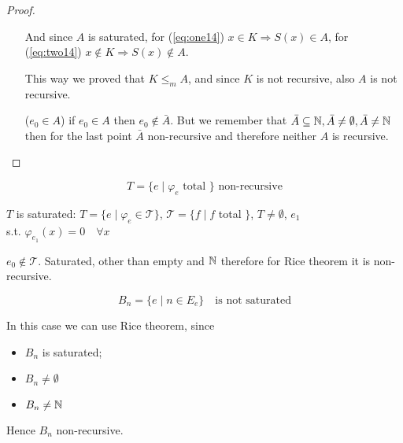 \begin{proof}
\begin{itemize}
    And since $A$ is saturated, for (\ref{eq:one14})
    $x \in K \Rightarrow S(x) \in A$, for (\ref{eq:two14})
    $x\notin K \Rightarrow S(x) \notin A$.

    This way we proved that $K \leq_m A$, and since $K$ is not
    recursive, also $A$ is not recursive.
    
  \item[($e_0 \in A$)] if $ e_0 \in A $ then $ e_0 \not \in \bar{A}
    $. But we remember that
    $ \bar{A} \subseteq \mathbb{N}, \bar{A} \neq \emptyset, \bar{A} \neq
    \mathbb{N} $ then for the last point $ \bar{A} $ non-recursive and
    therefore neither $A$ is recursive.
  \end{itemize}
\end{proof}

\begin{example}
  \[ T = \{e \mid \varphi_e \mbox{ total } \} \mbox{ non-recursive} \]

  $T$ is saturated: $ T = \{e \mid \varphi_e \in \mathcal{T} \} $, $
  \mathcal{T} = \{f \mid f $ total $ \} $, $ T\neq\emptyset $, $ e_1 $\\
  s.t. $ \varphi_{e_1}(x) = 0 \quad \forall x $

  $ e_0 \notin \mathcal{T} $. Saturated, other than empty and $ \mathbb{N} $
  therefore for Rice theorem it is non-recursive.
\end{example}

\begin{example}
  \[ B_n = \{e \mid n \in E_e \} \quad \mbox{is not saturated} \]

  In this case we can use Rice theorem, since
  \begin{itemize}
  \item $B_n$ is saturated;
  \item $B_n \neq \emptyset$
  \item $B_n \neq \mathbb{N}$ 
  \end{itemize}

  Hence $ B_n $ non-recursive.
\end{example}